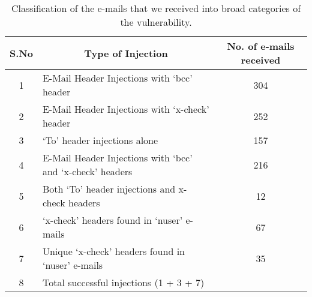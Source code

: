 \begin{table}[!htbp]
	\centering
	\begin{tabular}{|c|l|c|}
		\hline
		\multicolumn{1}{|c|}{\textbf{S.No}} &
		\multicolumn{1}{c|}{\textbf{Type of Injection}} &
		\multicolumn{1}{p{3cm}|}{\centering \textbf{No. of e-mails received}}\\
		\hline
		1 & E-Mail Header Injections with `bcc' header & 304\\
		\hline
		2 & E-Mail Header Injections with `x-check' header & 252\\
		\hline
		3 & `To' header injections alone & 157\\
		\hline
		4 & E-Mail Header Injections with `bcc' and `x-check' headers & 216\\
		\hline
		5 & Both `To' header injections and x-check headers &
		12\\
		\hline
		6 & `x-check' headers found in `nuser' e-mails & 67\\
		\hline
		7 & Unique `x-check' headers found in `nuser' e-mails & 35\\
		\hline
		8 & Total successful injections (1 + 3 + 7) & \success\ \\
		
		\hline
	\end{tabular}
	\caption[]{Classification of the e-mails that we received into broad categories of the vulnerability.}
	\label{tab:analysis}
\end{table}
